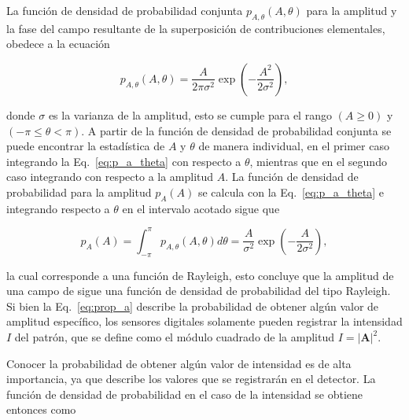La función de densidad de probabilidad conjunta $p_{A,\theta}(A,\theta)$ para la amplitud y la fase del campo resultante de la superposición de contribuciones elementales, obedece a la ecuación \cite{Goodman2010}

\begin{equation}
\label{eq:p_a_theta}
p_{A,\theta}(A,\theta) = \frac{A}{2\pi\sigma^2}\exp\left(-\frac{A^2}{2\sigma^2}\right),
\end{equation}

\noindent donde $\sigma$ es la varianza de la amplitud, esto se cumple para el rango $(A\geq0)$ y $(-\pi\leq\theta<\pi)$. A partir de la función de densidad de probabilidad conjunta se puede encontrar la estadística de $A$ y $\theta$ de manera individual, en el primer caso integrando la Eq.~\ref{eq:p_a_theta} con respecto a $\theta$, mientras que en el segundo caso integrando con respecto a la amplitud $A$. La función de densidad de probabilidad para la amplitud $p_A(A)$ se calcula con la Eq.~\ref{eq:p_a_theta} e integrando respecto a $\theta$ en el intervalo acotado sigue que

\begin{equation}
\label{eq:prop_a}
p_A(A) = \int_{-\pi}^{\pi}p_{A,\theta}(A,\theta) d\theta = \frac{A}{\sigma^2}\exp\left(-\frac{A}{2\sigma^2}\right),
\end{equation}

\noindent la cual corresponde a una función de Rayleigh, esto concluye que la amplitud de una campo de \speckle sigue una función de densidad de probabilidad del tipo Rayleigh. Si bien la Eq.~\ref{eq:prop_a} describe la probabilidad de obtener algún valor de amplitud específico, los sensores digitales solamente pueden registrar la intensidad $I$ del patrón, que se define como el módulo cuadrado de la amplitud $I = \lvert \boldsymbol{A}\rvert^2$. 

Conocer la probabilidad de obtener algún valor de intensidad es de alta importancia, ya que describe los valores que se registrarán en el detector. La función de densidad de probabilidad en el caso de la intensidad se obtiene entonces como



